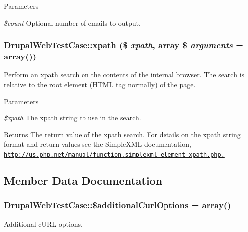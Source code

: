 \begin{DoxyParams}{Parameters}
\item[{\em \$count}]Optional number of emails to output. \end{DoxyParams}
\hypertarget{classDrupalWebTestCase_a3e5294d131f96468ef55f6f56192c77b}{
\subsubsection[{xpath}]{\setlength{\rightskip}{0pt plus 5cm}DrupalWebTestCase::xpath (\$ {\em xpath}, \/  array \$ {\em arguments} = {\ttfamily array()})}}
\label{classDrupalWebTestCase_a3e5294d131f96468ef55f6f56192c77b}
Perform an xpath search on the contents of the internal browser. The search is relative to the root element (HTML tag normally) of the page.


\begin{DoxyParams}{Parameters}
\item[{\em \$xpath}]The xpath string to use in the search. \end{DoxyParams}
\begin{DoxyReturn}{Returns}
The return value of the xpath search. For details on the xpath string format and return values see the SimpleXML documentation, \href{http://us.php.net/manual/function.simplexml-element-xpath.php.}{\tt http://us.php.net/manual/function.simplexml-\/element-\/xpath.php.} 
\end{DoxyReturn}


\subsection{Member Data Documentation}
\hypertarget{classDrupalWebTestCase_a8e4e1c5a9b63d403d10ad2f6a2f06aaa}{
\subsubsection[{\$additionalCurlOptions}]{\setlength{\rightskip}{0pt plus 5cm}DrupalWebTestCase::\$additionalCurlOptions = array()}}
\label{classDrupalWebTestCase_a8e4e1c5a9b63d403d10ad2f6a2f06aaa}
Additional cURL options.

